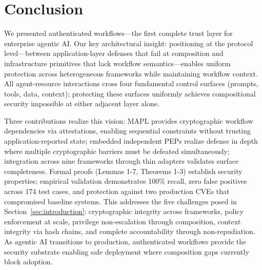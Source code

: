 \section{Conclusion}
\label{sec:conclusion}

We presented authenticated workflows—the first complete trust layer for enterprise agentic AI. Our key architectural insight: positioning at the protocol level—between application-layer defenses that fail at composition and infrastructure primitives that lack workflow semantics—enables uniform protection across heterogeneous frameworks while maintaining workflow context. All agent-resource interactions cross four fundamental control surfaces (prompts, tools, data, context); protecting these surfaces uniformly achieves compositional security impossible at either adjacent layer alone.

Three contributions realize this vision: MAPL provides cryptographic workflow dependencies via attestations, enabling sequential constraints without trusting application-reported state; embedded independent PEPs realize defense in depth where multiple cryptographic barriers must be defeated simultaneously; integration across nine frameworks through thin adapters validates surface completeness. Formal proofs (Lemmas 1-7, Theorems 1-3) establish security properties; empirical validation demonstrates 100\% recall, zero false positives across 174 test cases, and protection against two production CVEs that compromised baseline systems. This addresses the five challenges posed in Section~\ref{sec:introduction}: cryptographic integrity across frameworks, policy enforcement at scale, privilege non-escalation through composition, context integrity via hash chains, and complete accountability through non-repudiation. As agentic AI transitions to production, authenticated workflows provide the security substrate enabling safe deployment where composition gaps currently block adoption.
